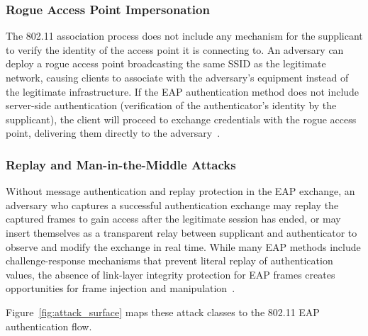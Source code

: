 \documentclass[journal]{IEEEtran}
\begin{document}
\subsubsection{Rogue Access Point Impersonation}

The 802.11 association process does not include any mechanism for the supplicant to
verify the identity of the access point it is connecting to. An adversary can deploy
a rogue access point broadcasting the same SSID as the legitimate network, causing
clients to associate with the adversary's equipment instead of the legitimate
infrastructure. If the EAP authentication method does not include server-side
authentication (verification of the authenticator's identity by the supplicant), the
client will proceed to exchange credentials with the rogue access point, delivering
them directly to the adversary~\cite{arbaugh2002}.

\subsubsection{Replay and Man-in-the-Middle Attacks}

Without message authentication and replay protection in the EAP exchange,
an adversary who captures a successful authentication exchange may replay the
captured frames to gain access after the legitimate session has ended, or may insert
themselves as a transparent relay between supplicant and authenticator to observe
and modify the exchange in real time. While many EAP methods include
challenge-response mechanisms that prevent literal replay of authentication values,
the absence of link-layer integrity protection for EAP frames creates opportunities
for frame injection and manipulation~\cite{he2004}.

Figure~\ref{fig:attack_surface} maps these attack classes to the 802.11
EAP authentication flow.
\end{document}
